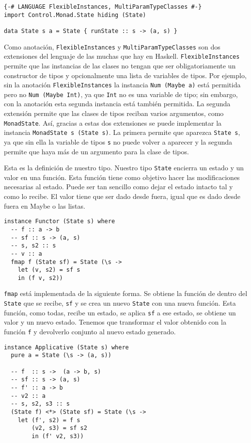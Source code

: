 \documentclass[class=article, crop=false]{standalone}
\begin{document}
\begin{verbatim}
{-# LANGUAGE FlexibleInstances, MultiParamTypeClasses #-}
import Control.Monad.State hiding (State)

data State s a = State { runState :: s -> (a, s) }
\end{verbatim}

Como anotación, \verb`FlexibleInstances` y \verb`MultiParamTypeClasses` son dos extensiones
del lenguaje de las muchas que hay en Haskell. \verb`FlexibleInstances` permite que las
instancias de las clases no tengan que ser obligatoriamente un constructor de tipos y
opcionalmente una lista de variables de tipos. Por ejemplo, sin la anotación
\verb`FlexibleInstances` la instancia \verb`Num (Maybe a)` está permitida pero no
\verb`Num (Maybe Int)`, ya que \verb`Int` no es una variable de tipo; sin embargo, con la
anotación esta segunda instancia está también permitida. La segunda extensión permite que las
clases de tipos reciban varios argumentos, como \verb`MonadState`. Así, gracias a estas dos
extensiones se puede implementar la instancia \verb`MonadState s (State s)`. La primera
permite que aparezca \verb`State s`, ya que sin ella la variable de tipos \verb`s` no puede
volver a aparecer y la segunda permite que haya más de un argumento para la clase de tipos.

Esta es la definición de nuestro tipo. Nuestro tipo \verb`State` encierra un estado y un
valor en una función. Esta función tiene como objetivo hacer las modificaciones necesarias al
estado. Puede ser tan sencillo como dejar el estado intacto tal y como lo recibe. El valor
tiene que ser dado desde fuera, igual que es dado desde fuera en Maybe o las listas.

\begin{verbatim}
instance Functor (State s) where
  -- f :: a -> b
  -- sf :: s -> (a, s)
  -- s, s2 :: s
  -- v :: a
  fmap f (State sf) = State (\s ->
    let (v, s2) = sf s
    in (f v, s2))
\end{verbatim}

\verb`fmap` está implementada de la siguiente forma. Se obtiene la función de dentro del
\verb`State` que se recibe, \verb`sf` y se crea un nuevo \verb`State` con una nueva función.
Esta función, como todas, recibe un estado, se aplica \verb`sf` a ese estado, se obtiene un
valor y un nuevo estado. Tenemos que transformar el valor obtenido con la función \verb`f` y
devolverlo conjunto al nuevo estado generado.

\begin{verbatim}
instance Applicative (State s) where
  pure a = State (\s -> (a, s))

  -- f  :: s ->  (a -> b, s)
  -- sf :: s -> (a, s)
  -- f' :: a -> b
  -- v2 :: a
  -- s, s2, s3 :: s
  (State f) <*> (State sf) = State (\s ->
    let (f', s2) = f s
        (v2, s3) = sf s2
        in (f' v2, s3))
\end{verbatim}
\end{document}
